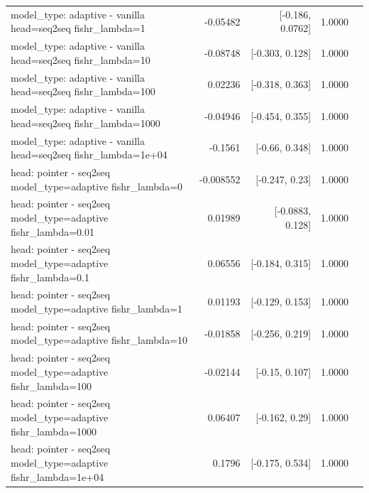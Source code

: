 \documentclass[10pt]{article}
\makeatletter
\newcommand{\stackcell}[1]{\begin{tabular}[t]{@{}l@{}}#1\end{tabular}}
\makeatother
\begin{document}
{\begin{longtable}{lrrrl}
\stackcell{model\_type: adaptive - vanilla\\\footnotesize head=seq2seq fishr\_lambda=1 } & -0.05482 & [-0.186, 0.0762] & 1.0000 & \\
\stackcell{model\_type: adaptive - vanilla\\\footnotesize head=seq2seq fishr\_lambda=10 } & -0.08748 & [-0.303, 0.128] & 1.0000 & \\
\stackcell{model\_type: adaptive - vanilla\\\footnotesize head=seq2seq fishr\_lambda=100 } & 0.02236 & [-0.318, 0.363] & 1.0000 & \\
\stackcell{model\_type: adaptive - vanilla\\\footnotesize head=seq2seq fishr\_lambda=1000 } & -0.04946 & [-0.454, 0.355] & 1.0000 & \\
\stackcell{model\_type: adaptive - vanilla\\\footnotesize head=seq2seq fishr\_lambda=1e+04 } & -0.1561 & [-0.66, 0.348] & 1.0000 & \\
\stackcell{head: pointer - seq2seq\\\footnotesize model\_type=adaptive fishr\_lambda=0 } & -0.008552 & [-0.247, 0.23] & 1.0000 & \\
\stackcell{head: pointer - seq2seq\\\footnotesize model\_type=adaptive fishr\_lambda=0.01 } & 0.01989 & [-0.0883, 0.128] & 1.0000 & \\
\stackcell{head: pointer - seq2seq\\\footnotesize model\_type=adaptive fishr\_lambda=0.1 } & 0.06556 & [-0.184, 0.315] & 1.0000 & \\
\stackcell{head: pointer - seq2seq\\\footnotesize model\_type=adaptive fishr\_lambda=1 } & 0.01193 & [-0.129, 0.153] & 1.0000 & \\
\stackcell{head: pointer - seq2seq\\\footnotesize model\_type=adaptive fishr\_lambda=10 } & -0.01858 & [-0.256, 0.219] & 1.0000 & \\
\stackcell{head: pointer - seq2seq\\\footnotesize model\_type=adaptive fishr\_lambda=100 } & -0.02144 & [-0.15, 0.107] & 1.0000 & \\
\stackcell{head: pointer - seq2seq\\\footnotesize model\_type=adaptive fishr\_lambda=1000 } & 0.06407 & [-0.162, 0.29] & 1.0000 & \\
\stackcell{head: pointer - seq2seq\\\footnotesize model\_type=adaptive fishr\_lambda=1e+04 } & 0.1796 & [-0.175, 0.534] & 1.0000 & \\

\end{longtable}}
\end{document}
